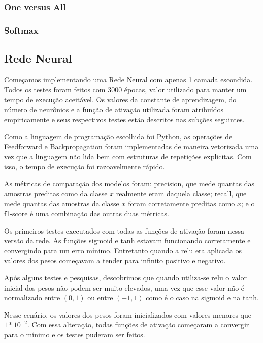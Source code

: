 \documentclass[conference]{IEEEtran}
\begin{document}
\subsubsection{One versus All}

\subsubsection{Softmax}

\subsection{Rede Neural}

	Começamos implementando uma Rede Neural com apenas 1 camada escondida. Todos os testes foram feitos com 3000 épocas, valor utilizado para manter um tempo de execução aceitável. Os valores da constante de aprendizagem, do número de neurônios e a função de ativação utilizada foram atribuídos empiricamente e seus respectivos testes estão descritos nas subções seguintes.
	
	Como a linguagem de programação escolhida foi Python, as operações de Feedforward e Backpropagation foram implementadas de maneira vetorizada uma vez que a linguagem não lida bem com estruturas de repetições explicitas. Com isso, o tempo de execução foi razoavelmente rápido.
	
	As métricas de comparação dos modelos foram: precision, que mede quantas das amostras preditas como da classe $x$ realmente eram daquela classe; recall, que mede quantas das amostras da classe $x$ foram corretamente preditas como $x$; e o f1-score é uma combinação das outras duas métricas.
	
	Os primeiros testes executados com todas as funções de ativação foram nessa versão da rede. As funções sigmoid e tanh estavam funcionando corretamente e convergindo para um erro mínimo. Entretanto quando a relu era aplicada os valores dos pesos começavam a tender para infinito positivo e negativo.
	
	Após alguns testes e pesquisas, descobrimos que quando utiliza-se relu o valor inicial dos pesos não podem ser muito elevados, uma vez que esse valor não é normalizado entre $(0,1)$ ou entre $(-1,1)$ como é o caso na sigmoid e na tanh.
	
	Nesse cenário, os valores dos pesos foram inicializados com valores menores que $1*10^{-2}$. Com essa alteração, todas funções de ativação começaram a convergir para o mínimo e os testes puderam ser feitos.
\end{document}
